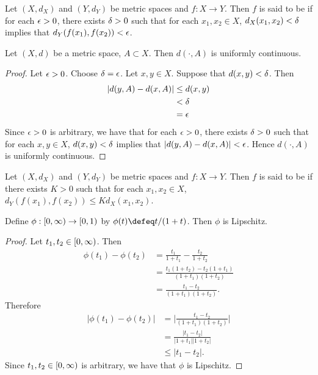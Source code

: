 \documentclass{book}
\begin{document}
\begin{defn} 
	Let $(X, d_X)$ and $(Y, d_Y)$ be metric spaces and $f:X \rightarrow Y$. Then $f$ is said to be  if for each $\epsilon > 0$, there exists $\delta > 0$ such that for each $x_1, x_2 \in X$, $d_X(x_1, x_2) < \delta$ implies that $d_Y(f(x_1), f(x_2)) < \epsilon$.
\end{defn}

\begin{ex} 
	Let $(X, d)$ be a metric space, $A \subset X$. Then $d(\cdot, A)$ is uniformly continuous.
\end{ex}

\begin{proof}
	Let $\epsilon > 0$. Choose $\delta = \epsilon$. Let $x, y \in X$. Suppose that $d(x,y) < \delta$. Then 
	\begin{align*}
		|d(y, A) - d(x, A)|
		& \leq d(x,y) \\
		& < \delta \\
		& = \epsilon 
	\end{align*}
	Since $\epsilon > 0$ is arbitrary, we have that for each $\epsilon > 0$, there exists $\delta > 0$ such that for each $x,y \in X$, $d(x,y) < \delta$ implies that $|d(y, A) - d(x, A)| < \epsilon$. Hence $d(\cdot, A)$ is uniformly continuous.
\end{proof}

\begin{defn} 
	Let $(X, d_X)$ and $(Y, d_Y)$ be metric spaces and $f:X \rightarrow Y$. Then $f$ is said to be  if there exists $K > 0$ such that for each $x_1, x_2 \in X$, $d_Y(f(x_1), f(x_2)) \leq K d_X(x_1, x_2)$. 
\end{defn}

\begin{ex} 
	Define $\phi: [0,\infty) \rightarrow [0,1)$ by $\phi(t) \defeq t/(1+ t)$. Then $\phi$ is Lipschitz. 
\end{ex}

\begin{proof}
	Let $t_1, t_2 \in [0,\infty)$. Then 
	\begin{align*}
		\phi(t_1) - \phi(t_2)
		& = \frac{t_1}{1 + t_1} - \frac{t_2}{1 + t_2} \\
		& = \frac{t_1(1+ t_2) - t_2(1+ t_1)}{(1 + t_1)(1 + t_2)} \\
		& = \frac{t_1 - t_2}{(1 + t_1)(1 + t_2)}.
	\end{align*}
	Therefore 
	\begin{align*}
		|\phi(t_1) - \phi(t_2)| 
		& = \bigg| \frac{t_1 - t_2}{(1 + t_1)(1 + t_2)} \bigg| \\
		& = \frac{|t_1 - t_2|}{|1 + t_1||1 + t_2|} \\
		& \leq |t_1 - t_2|.
	\end{align*}
	Since $t_1, t_2 \in [0,\infty)$ is arbitrary, we have that $\phi$ is Lipschitz.
\end{proof}
\end{document}
